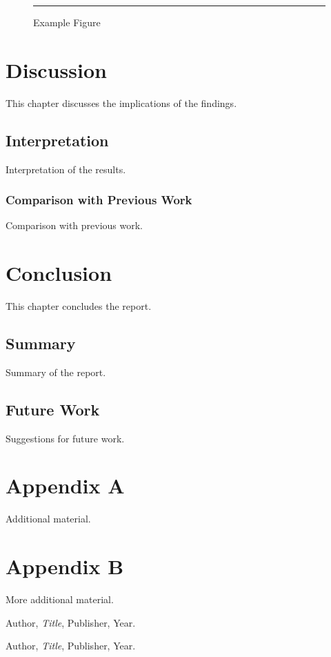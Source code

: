 \documentclass[a4paper,12pt]{report}
\begin{document}
\begin{figure}
  \centering
  \rule{5cm}{5cm}
  \caption{Example Figure}\label{fig:example}
\end{figure}

\chapter{Discussion}
This chapter discusses the implications of the findings.

\section{Interpretation}
Interpretation of the results.

\subsection{Comparison with Previous Work}
Comparison with previous work.

\chapter{Conclusion}
This chapter concludes the report.

\section{Summary}
Summary of the report.

\section{Future Work}
Suggestions for future work.

\appendix
\chapter{Appendix A}
Additional material.

\chapter{Appendix B}
More additional material.

\begin{thebibliography}{9}
  Author, \emph{Title}, Publisher, Year.

  Author, \emph{Title}, Publisher, Year.
\end{thebibliography}
\end{document}

